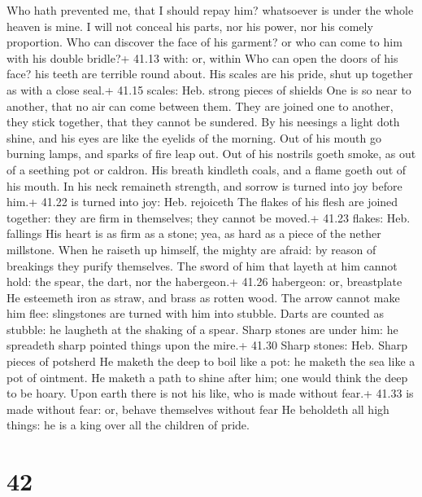  Who hath prevented me, that I should repay him? whatsoever
is under the whole heaven is mine.  I will not conceal his
parts, nor his power, nor his comely proportion.  Who can
discover the face of his garment? or who can come to him with his double
bridle?+ 41.13 with: or, within  Who can open the doors of
his face? his teeth are terrible round about.  His scales
are his pride, shut up together as with a close seal.+ 41.15 scales:
Heb. strong pieces of shields  One is so near to another,
that no air can come between them.  They are joined one to
another, they stick together, that they cannot be sundered.
 By his neesings a light doth shine, and his eyes are like
the eyelids of the morning.  Out of his mouth go burning
lamps, and sparks of fire leap out.  Out of his nostrils
goeth smoke, as out of a seething pot or caldron.  His
breath kindleth coals, and a flame goeth out of his mouth. 
In his neck remaineth strength, and sorrow is turned into joy before
him.+ 41.22 is turned into joy: Heb. rejoiceth  The flakes
of his flesh are joined together: they are firm in themselves; they
cannot be moved.+ 41.23 flakes: Heb. fallings  His heart is
as firm as a stone; yea, as hard as a piece of the nether millstone.
 When he raiseth up himself, the mighty are afraid: by
reason of breakings they purify themselves.  The sword of
him that layeth at him cannot hold: the spear, the dart, nor the
habergeon.+ 41.26 habergeon: or, breastplate  He esteemeth
iron as straw, and brass as rotten wood.  The arrow cannot
make him flee: slingstones are turned with him into stubble.
 Darts are counted as stubble: he laugheth at the shaking
of a spear.  Sharp stones are under him: he spreadeth sharp
pointed things upon the mire.+ 41.30 Sharp stones: Heb. Sharp pieces of
potsherd  He maketh the deep to boil like a pot: he maketh
the sea like a pot of ointment.  He maketh a path to shine
after him; one would think the deep to be hoary.  Upon
earth there is not his like, who is made without fear.+ 41.33 is made
without fear: or, behave themselves without fear  He
beholdeth all high things: he is a king over all the children of pride.

\hypertarget{section-41}{%
\section{42}\label{section-41}}

